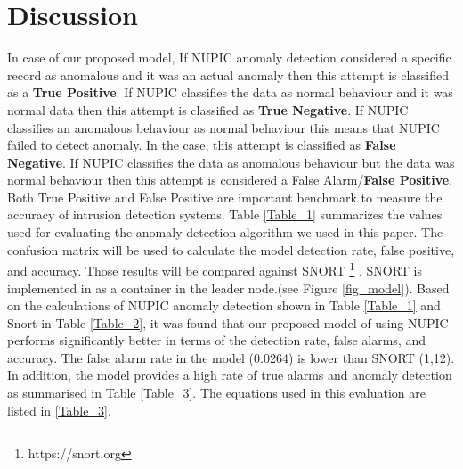 \documentclass[sigconf]{acmart}
\begin{document}
 \section{Discussion}
\label{sec:disc}

In case of our proposed model, If NUPIC anomaly detection considered a specific record as anomalous and it was an actual anomaly then this attempt is classified as a \textbf{True Positive}. If NUPIC classifies the data as normal behaviour and it was normal data then this attempt is classified as \textbf{True Negative}. If NUPIC classifies an anomalous behaviour as normal behaviour this means that NUPIC failed to detect anomaly. In the case, this attempt is classified as \textbf{False Negative}. If NUPIC classifies the data as anomalous behaviour but the data was normal behaviour then this attempt is considered a False Alarm/\textbf{False Positive}. Both True Positive and False Positive are important benchmark to measure the accuracy of intrusion detection systems. Table \ref{Table_1} summarizes the values used for evaluating the anomaly detection algorithm we used in this paper. The confusion matrix will be used to calculate the model detection rate, false positive, and accuracy. Those results will be compared against SNORT \footnote{https://snort.org} \cite{roesch1999snort}. SNORT is implemented in as a container in the leader node.(see Figure \ref{fig_model}). Based on the calculations of NUPIC anomaly detection shown in Table \ref{Table_1} and Snort in Table \ref{Table_2}, it was found that our proposed model of using NUPIC performs significantly better in terms of the detection rate, false alarms, and accuracy. The false alarm rate in the model (0.0264) is lower than SNORT (1,12). In addition, the model provides a high rate of true alarms and anomaly detection as summarised in Table \ref{Table_3}. The equations used in this evaluation are listed in \ref{Table_3}.    
 
\end{document}
